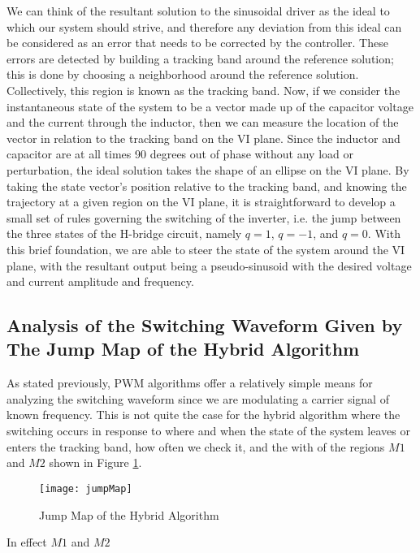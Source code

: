 We can think of the resultant solution to the sinusoidal driver as the ideal to which our system should strive, and therefore any deviation from this ideal can be considered as an error that needs to be corrected by the controller. These errors are detected by building a tracking band around the reference solution; this is done by choosing a neighborhood around the reference solution. Collectively, this region is known as the tracking band. Now, if we consider the instantaneous state of the system to be a vector made up of the capacitor voltage and the current through the inductor, then we can measure the location of the vector in relation to the tracking band on the VI plane. Since the inductor and capacitor are at all times 90 degrees out of phase without any load or perturbation, the ideal solution takes the shape of an ellipse on the VI plane. By taking the state vector's position relative to the tracking band, and knowing the trajectory at a given region on the VI plane, it is straightforward to develop a small set of rules governing the switching of the inverter, i.e. the jump between the three states of the H-bridge circuit, namely $q=1$, $q=-1$, and $q=0$. With this brief foundation, we are able to steer the state of the system around the VI plane, with the resultant output being a pseudo-sinusoid with the desired voltage and current amplitude and frequency. 

\subsection{Analysis of the Switching Waveform Given by The Jump Map of the Hybrid Algorithm}
As stated previously, PWM algorithms offer a relatively simple means for analyzing the switching waveform since we are modulating a carrier signal of known frequency. This is not quite the case for the hybrid algorithm where the switching occurs in response to where and when the state of the system leaves or enters the tracking band, how often we check it, and the with of the regions $M1$ and $M2$ shown in Figure \ref{jump}.

\begin{figure}[htbp]
\begin{center}
\texttt{[image: jumpMap]}
\caption{Jump Map of the Hybrid Algorithm \cite{ricardo}}
\label{jump}
\end{center}
\end{figure}

In effect $M1$ and $M2$
